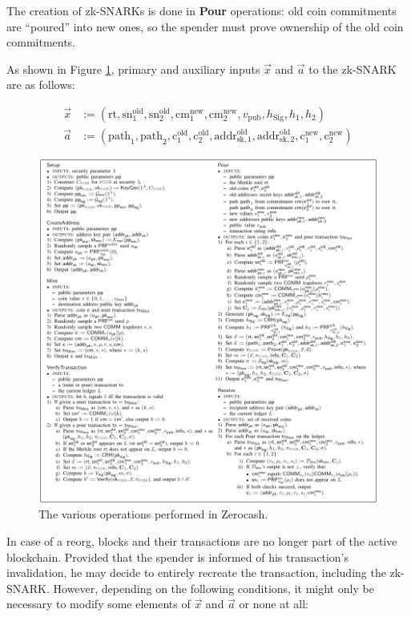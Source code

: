 \documentclass{article}
\begin{document}
The creation of zk-SNARKs is done in \textbf{Pour} operations:
old coin commitments are ``poured'' into new ones, so the spender must prove ownership of the old coin commitments.

As shown in Figure \ref{fig:zerocash}, primary and auxiliary inputs $\vec{x}$ and $\vec{a}$ to the zk-SNARK are as follows:

\begin{align*}
        \vec{x} &:= (\text{rt}, \text{sn}_1^\text{old}, \text{sn}_2^\text{old}, \text{cm}_1^\text{new}, \text{cm}_2^\text{new}, v_\text{pub}, h_\text{Sig}, h_1, h_2) \\
        \vec{a} &:= (\text{path}_1, \text{path}_2, \text{c}_1^\text{old}, \text{c}_2^\text{old}, \text{addr}_{\text{sk},1}^\text{old}, \text{addr}_{\text{sk},2}^\text{old}, \text{c}_1^\text{new}, \text{c}_2^\text{new})
\end{align*}

\begin{figure}[t]
\includegraphics[width=\textwidth]{zerocash-zksnark.png}
\caption{The various operations performed in Zerocash. \cite{bensasson:zerocash}} \label{fig:zerocash}
\centering
\end{figure}

In case of a reorg, blocks and their transactions are no longer part of the active blockchain.
Provided that the spender is informed of his transaction's invalidation, he may decide to entirely recreate the transaction, including the zk-SNARK.
However, depending on the following conditions, it might only be necessary to modify some elements of $\vec{x}$ and $\vec{a}$ or none at all:
\end{document}
